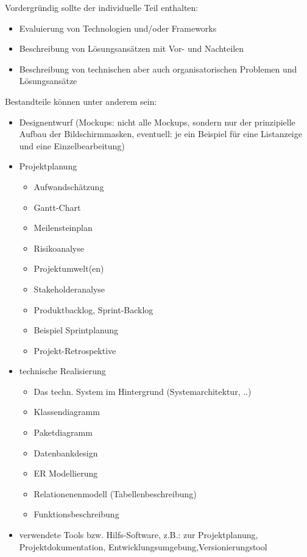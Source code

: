 Vordergründig sollte der individuelle Teil enthalten:
\begin{itemize}
    \item Evaluierung von Technologien und/oder Frameworks
    \item Beschreibung von Lösungsansätzen mit Vor- und Nachteilen
    \item Beschreibung von technischen aber auch organisatorischen Problemen und Lösungsansätze
\end{itemize}

Bestandteile können unter anderem sein:
\begin{itemize}
    \item Designentwurf (Mockups: nicht alle Mockups, sondern nur der prinzipielle Aufbau der Bildschirmmasken, eventuell: je ein Beispiel für eine Listanzeige und eine Einzelbearbeitung)
    \item Projektplanung
        \begin{itemize}
            \item Aufwandschätzung
            \item Gantt-Chart
            \item Meilensteinplan
            \item Risikoanalyse
            \item Projektumwelt(en)
            \item Stakeholderanalyse
            \item Produktbacklog, Sprint-Backlog
            \item Beispiel Sprintplanung
            \item Projekt-Retrospektive
        \end{itemize}
    \item technische Realisierung
        \begin{itemize}
            \item Das techn. System im Hintergrund (Systemarchitektur, ..)
            \item Klassendiagramm
            \item Paketdiagramm
            \item Datenbankdesign
            \item ER Modellierung
            \item Relationenenmodell (Tabellenbeschreibung)
            \item Funktionsbeschreibung
        \end{itemize}
    \item verwendete Tools bzw. Hilfs-Software, z.B.: zur Projektplanung, Projektdokumentation, Entwicklungsumgebung,Versionierungstool

\end{itemize}

